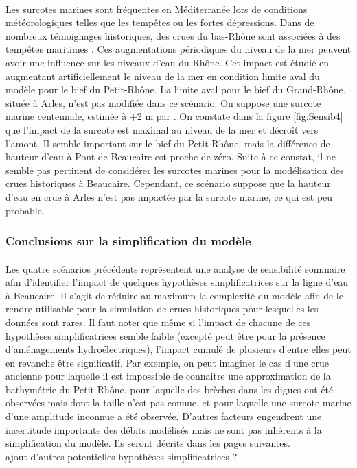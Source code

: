 \documentclass[11pt]{article}
\begin{document}
	\paragraph{} Les surcotes marines sont fréquentes en Méditerranée lors de conditions météorologiques telles que les tempêtes ou les fortes dépressions. Dans de nombreux témoignages historiques, des crues du bas-Rhône sont associées à des tempêtes maritimes \citet{pichard_sept_2014}. Ces augmentations périodiques du niveau de la mer peuvent avoir une influence sur les niveaux d'eau du Rhône. Cet impact est étudié en augmentant artificiellement le niveau de la mer en condition limite aval du modèle pour le bief du Petit-Rhône. La limite aval pour le bief du Grand-Rhône, située à Arles, n'est pas modifiée dans ce scénario. On suppose une surcote marine centennale, estimée à +2 m par \citet{kergadallan_estimation_2015}. On constate dans la figure \ref{fig:Sensib4} que l'impact de la surcote est maximal au niveau de la mer et décroit vers l'amont. Il semble important sur le bief du Petit-Rhône, mais la différence de hauteur d'eau à Pont de Beaucaire est proche de zéro. Suite à ce constat, il ne semble pas pertinent de considérer les surcotes marines pour la modélisation des crues historiques à Beaucaire. Cependant, ce scénario suppose que la hauteur d'eau en crue à Arles n'est pas impactée par la surcote marine, ce qui est peu probable.
	
	\subsubsection{Conclusions sur la simplification du modèle}
	
	\paragraph{} Les quatre scénarios précédents représentent une analyse de sensibilité sommaire afin d'identifier l'impact de quelques hypothèses simplificatrices sur la ligne d'eau à Beaucaire. Il s'agit de réduire au maximum la complexité du modèle afin de le rendre utilisable pour la simulation de crues historiques pour lesquelles les données sont rares. Il faut noter que même si l'impact de chacune de ces hypothèses simplificatrices semble faible (excepté peut être pour la présence d'aménagements hydroélectriques), l'impact cumulé de plusieurs d'entre elles peut en revanche être significatif. Par exemple, on peut imaginer le cas d'une crue ancienne pour laquelle il est impossible de connaitre une approximation de la bathymétrie du Petit-Rhône, pour laquelle des brèches dans les digues ont été observées mais dont la taille n'est pas connue, et pour laquelle une surcote marine d'une amplitude inconnue a été observée. D'autres facteurs engendrent une incertitude importante des débits modélisés mais ne sont pas inhérents à la simplification du modèle. Ils seront décrits dans les pages suivantes. \\
	ajout d'autres potentielles hypothèses simplificatrices ?
	
\end{document}
